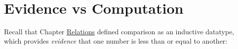 \begin{fence}
\begin{code}
\AgdaSpace{}%
\AgdaSymbol{)}\<%
\\
\>[0]\AgdaSpace{}%
\AgdaSpace{}%
\AgdaSpace{}%
\AgdaSpace{}%
\AgdaSymbol{(}\AgdaSymbol{;}\AgdaSpace{}%
\AgdaSymbol{)}\<%
\\
\>[0]\AgdaSpace{}%
\AgdaSpace{}%
\AgdaSpace{}%
\AgdaSpace{}%
\AgdaSymbol{(}\AgdaSymbol{;}\AgdaSpace{}%
\AgdaSymbol{)}\<%
\\
\>[0]\AgdaSpace{}%
\AgdaSpace{}%
\AgdaSpace{}%
\AgdaSpace{}%
\AgdaSymbol{(}\AgdaOperator{\AgdaDatatype{\AgdaUnderscore{}<\AgdaUnderscore{}}}\AgdaSymbol{;}\AgdaSpace{}%
\AgdaSymbol{;}\AgdaSpace{}%
\AgdaSymbol{)}\<%
\\
\>[0]\AgdaSpace{}%
\AgdaSpace{}%
\AgdaSpace{}%
\AgdaSpace{}%
\AgdaSymbol{(}\AgdaSymbol{)}\<%
\end{code}
\end{fence}

\hypertarget{evidence-vs-computation}{%
\section{Evidence vs Computation}\label{evidence-vs-computation}}

Recall that Chapter \protect\hyperlink{Relations}{Relations} defined
comparison as an inductive datatype, which provides \emph{evidence} that
one number is less than or equal to another:

